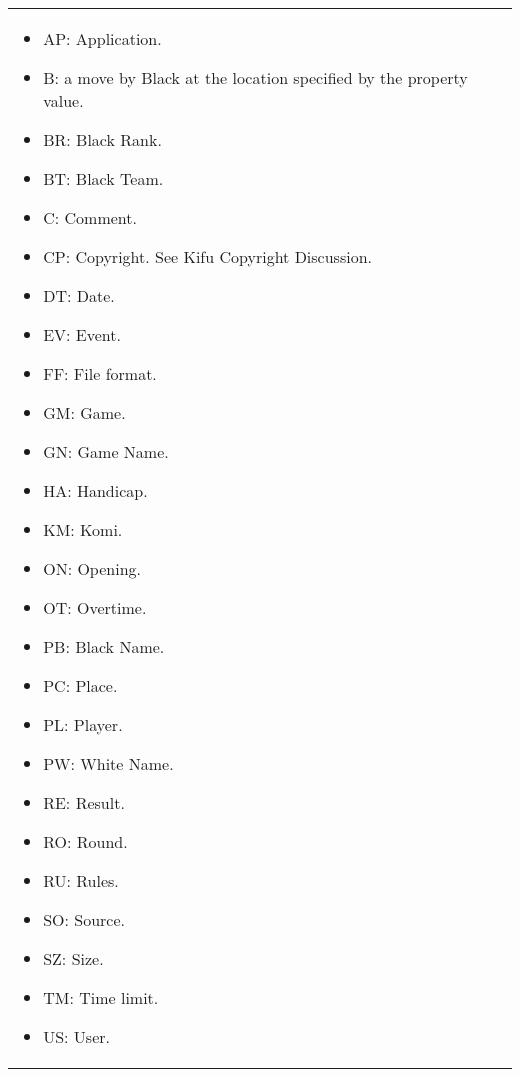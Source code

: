 \begin{longtable}{|p{\varnamewidth}|p{\vardescrwidth}|l}
\begin{itemize}
\item AP: Application.

\item B: a move by Black at the location specified by the property value.

\item BR: Black Rank.

\item BT: Black Team.

\item C: Comment.

\item CP: Copyright. See Kifu Copyright Discussion.

\item DT: Date.

\item EV: Event.

\item FF: File format.

\item GM: Game.

\item GN: Game Name.

\item HA: Handicap.

\item KM: Komi.

\item ON: Opening.

\item OT: Overtime.

\item PB: Black Name.

\item PC: Place.

\item PL: Player.

\item PW: White Name.

\item RE: Result.

\item RO: Round.

\item RU: Rules.

\item SO: Source.

\item SZ: Size.

\item TM: Time limit.

\item US: User.


\end{itemize}
\end{longtable}
